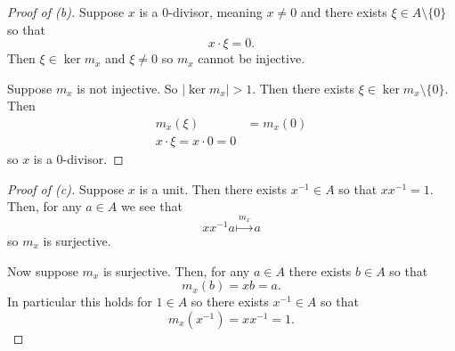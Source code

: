 \documentclass[11pt]{article}
\begin{document}
\begin{proof}[Proof of (b)]
    Suppose $x$ is a $0$-divisor, meaning $x \neq 0$ and there  
    exists $\xi \in A\setminus \{0\}$ so that 
    \[
        x \cdot \xi = 0.
    \]
    Then $\xi \in \ker m_x$ and $\xi \neq 0$ so 
    $m_x$ cannot be injective. 

    Suppose $m_x$ is not injective. 
    So $|\ker m_x| > 1$. Then there exists 
    $\xi \in \ker m_x \setminus \{0\}$. 
    Then 
    \begin{align*}
        m_x(\xi) &= m_x(0) \\ 
        x \cdot \xi = x \cdot 0 = 0
    \end{align*}
    so $x$ is a $0$-divisor.
\end{proof}
\begin{proof}[Proof of (c)]
    Suppose $x$ is a unit. Then there exists 
    $x^{-1} \in A$ so that 
    $xx^{-1} = 1$. 
    Then, for any $a \in A$ we see that 
    \[
        xx^{-1}a \overset{m_x}{\mapsto} a
    \]
    so $m_x$ is surjective. 

    Now suppose $m_x$ is surjective. Then, for 
    any $a \in A$ there exists $b \in A$ so that 
    \[
        m_x(b) = xb = a. 
    \]
    In particular this holds 
    for $1 \in A$ so there exists $x^{-1} \in A$ so that 
    \[
        m_x(x^{-1}) = xx^{-1} = 1. 
    \]
\end{proof}
\end{document}

